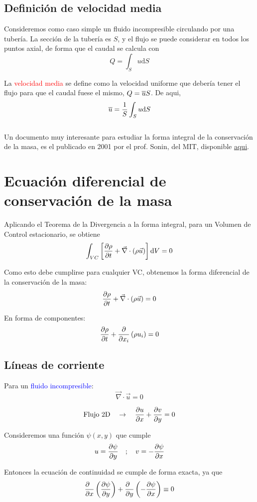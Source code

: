 \subsection{Definición de velocidad media}

	
	Consideremos como caso simple un fluido incompresible circulando por
	una tubería. La sección de la tubería es $S$, y el flujo se puede
	considerar en todos los puntos axial, de forma que el caudal se calcula
	con 
	\[
	Q=\int_{S}u\text{d}S
	\]
	
	La \textcolor{red}{velocidad media} se define como la velocidad uniforme
	que debería tener el flujo para que el caudal fuese el mismo, $Q=\overline{u}S$.
	De aqui, 
	\[
	\overline{u}=\frac{1}{S}\int_{S}u\text{d}S
	\]
	\\
	Un documento muy interesante para estudiar la forma integral de la
	conservación de la masa, es el publicado en 2001 por el prof. Sonin,
	del MIT, disponible \href{http://web.mit.edu/2.25/www/pdf/cv.pdf}{aqui}.


\section{Ecuación diferencial de conservación de la masa}

	
	Aplicando el Teorema de la Divergencia a la forma integral, para un
	Volumen de Control estacionario, se obtiene 
	\[
	\int_{VC}\left[\frac{\partial \rho}{\partial t}+\vec{\nabla}\cdot\left(\rho\vec{u}\right)\right]\text{d}V=0
	\]
	
	Como esto debe cumplirse para cualquier VC, obtenemos la forma diferencial
	de la conservación de la masa: 
	\[
	\frac{\partial \rho}{\partial t}+\vec{\nabla}\cdot\left(\rho\vec{u}\right)=0
	\]
	
	En forma de componentes: 
	\[
	\frac{\partial \rho}{\partial t}+\frac{\partial }{\partial x_{i}}\left(\rho u_{i}\right)=0
	\]
	

\subsection{Líneas de corriente}

	
	Para un \textcolor{blue}{fluido incompresible}: 
	\[
	\vec{\nabla}\cdot\vec{u}=0
	\]
	
	\[
	\text{Flujo 2D}\quad\rightarrow\quad\frac{\partial u}{\partial x}+\frac{\partial v}{\partial y}=0
	\]
	
	Consideremos una función $\psi(x,y)$ que cumple 
	\[
	u=\frac{\partial \psi}{\partial y}\quad;\quad v=-\frac{\partial \psi}{\partial x}
	\]
	
	Entonces la ecuación de continuidad se cumple de forma exacta, ya
	que 
	\[
	\frac{\partial \phantom{x}}{\partial x}\left(\frac{\partial \psi}{\partial y}\right)+\frac{\partial \phantom{y}}{\partial y}\left(-\frac{\partial \psi}{\partial x}\right)\equiv0
	\]
	

